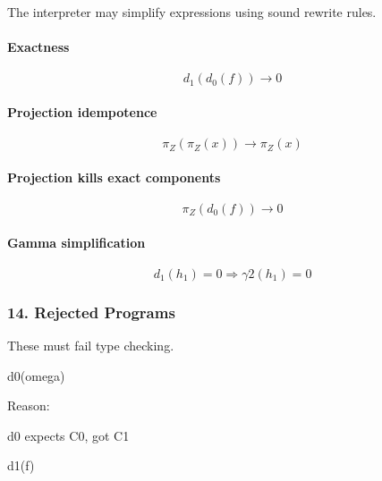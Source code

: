 \documentclass[
]{article}
\newenvironment{Shaded}{\begin{snugshade}}{\end{snugshade}}
\newcommand{\NormalTok}[1]{\textcolor[rgb]{0.12,0.11,0.11}{#1}}
\begin{document}
The interpreter may simplify expressions using sound rewrite rules.

\paragraph{Exactness}\label{exactness}

\[
d_1(d_0(f)) \to 0
\]

\paragraph{Projection idempotence}\label{projection-idempotence}

\[
\pi_Z(\pi_Z(x)) \to \pi_Z(x)
\]

\paragraph{Projection kills exact components}\label{projection-kills-exact-components}

\[
\pi_Z(d_0(f)) \to 0
\]

\paragraph{Gamma simplification}\label{gamma-simplification}

\[
d_1(h_1)=0 \Rightarrow \gamma2(h_1)=0
\]

\subsubsection{14. Rejected Programs}\label{rejected-programs}

These must fail type checking.

\begin{Shaded}
\begin{Highlighting}[]
\NormalTok{d0(omega)}
\end{Highlighting}
\end{Shaded}

Reason:

\begin{Shaded}
\begin{Highlighting}[]
\NormalTok{d0 expects C0, got C1}
\end{Highlighting}
\end{Shaded}

\begin{Shaded}
\begin{Highlighting}[]
\NormalTok{d1(f)}
\end{Highlighting}
\end{Shaded}
\end{document}
